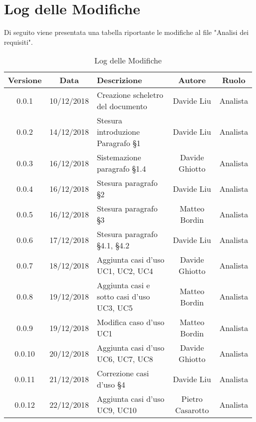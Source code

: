 \section{Log delle Modifiche}
Di seguito viene presentata una tabella riportante le modifiche al file "Analisi dei requisiti".

\begin{table}[!h] %
            \centering
            \renewcommand{\arraystretch}{2}
            \begin{tabular}{|c|c|p{5cm}|c|c|} %
                \rowcolor{orange!50} %
        		\hline
        		\textbf{Versione} & \textbf{Data} & \textbf{Descrizione} & \textbf{Autore} & \textbf{Ruolo} \\
                \hline
                0.0.1 & 10/12/2018 & Creazione scheletro del documento & Davide Liu & Analista \\
                \hline
                0.0.2 & 14/12/2018 & Stesura introduzione Paragrafo §1 & Davide Liu & Analista \\
                \hline
                0.0.3 & 16/12/2018 & Sistemazione  paragrafo §1.4 & Davide Ghiotto & Analista \\
                \hline
                0.0.4 & 16/12/2018 & Stesura paragrafo §2 & Davide Liu & Analista \\
                \hline
                0.0.5 & 16/12/2018 & Stesura paragrafo §3 & Matteo Bordin & Analista \\
                \hline
                0.0.6 & 17/12/2018 & Stesura paragrafo §4.1, §4.2 & Davide Liu & Analista \\
                \hline
                0.0.7 & 18/12/2018 & Aggiunta casi d’uso UC1, UC2, UC4 & Davide Ghiotto & Analista \\
                \hline
                0.0.8 & 19/12/2018 & Aggiunta casi e sotto casi d’uso UC3, UC5 & Matteo Bordin & Analista \\
                \hline
                0.0.9 & 19/12/2018 & Modifica caso d’uso UC1 & Matteo Bordin & Analista \\
                \hline
                0.0.10 & 20/12/2018 & Aggiunta casi d’uso UC6, UC7, UC8 & Davide Ghiotto & Analista \\
                \hline
                0.0.11 & 21/12/2018 & Correzione casi d’uso §4 & Davide Liu & Analista \\
                \hline
                0.0.12 & 22/12/2018 & Aggiunta casi d’uso UC9, UC10 & Pietro Casarotto & Analista \\
                \hline
                
        \end{tabular}
        \caption{Log delle Modifiche} %
        \label{tab:Log delle modifiche}
\end{table}

